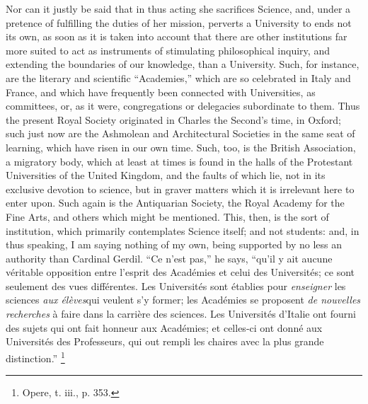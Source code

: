 Nor can it justly be said that in thus acting she sacrifices Science,
and, under a pretence of fulfilling the duties of her mission, perverts
a University to ends not its own, as soon as it is taken into account
that there are other institutions far more suited to act as instruments
of stimulating philosophical inquiry, and extending the boundaries of
our knowledge, than a University. Such, for instance, are the literary
and scientific ``Academies,'' which are so celebrated in Italy
and France, and which have frequently been connected with Universities,
as committees, or, as it were, congregations or delegacies subordinate
to them. Thus the present Royal Society originated in Charles the Second's
time, in Oxford; such just now are the Ashmolean and Architectural
Societies in the same seat of learning, which have risen in our own
time. Such, too, is the British Association, a migratory body, which at
least at times is found in the halls of the Protestant Universities of
the United Kingdom, and the faults of which lie, not in its exclusive
devotion to science, but in graver matters which it is irrelevant here
to enter upon. Such again is the Antiquarian Society, the Royal Academy
for the Fine Arts, and others which might be mentioned. This, then, is
the sort of institution, which primarily contemplates Science itself;
and not students: and, in thus speaking, I am saying nothing of
my own, being supported by no less an authority than Cardinal Gerdil.
``Ce n'est pas,'' he says, ``qu'il y ait aucune véritable
opposition entre l'esprit des Académies et celui des Universités; ce
sont seulement des vues différentes. Les Universités sont établies
pour \emph{enseigner} les sciences \emph{aux élèves}qui veulent s'y
former; les Académies se proposent \emph{de nouvelles recherches} à
faire dans la carrière des sciences. Les Universités d'Italie ont
fourni des sujets qui ont fait honneur aux Académies; et celles-ci ont
donné aux Universités des Professeurs, qui out rempli les chaires avec
la plus grande distinction.'' \footnote{Opere, t. iii., p. 353.}

